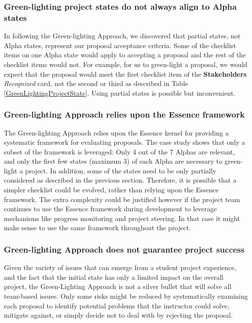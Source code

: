 \subsubsection{Green-lighting project states do not always
align to Alpha states}

In following the Green-lighting Approach, we discovered that partial
states, not Alpha states, represent our proposal acceptance criteria.
Some of the checklist items on one Alpha state would apply to accepting
a proposal and the rest of the checklist items would not. For example, 
for us to green-light a proposal, we would expect that the
proposal would meet the first checklist item of the
 \textbf{Stakeholders} \textit{Recognized} card, not the second or third as
described in Table \ref{GreenLightingProjectState}. 
Using partial states is possible but inconvenient. 

\subsubsection{Green-lighting Approach relies upon the Essence framework}
The Green-lighting Approach relies upon the Essence kernel for providing 
a systematic framework for evaluating proposals. The case study shows that  
only a subset of the framework is leveraged: Only 4 out of the 7 Alphas are 
relevant, and only the first few states (maximum 3) of each Alpha are necessary 
to green-light a project. In addition, some of the states need to be only partially 
considered as described in the previous section. Therefore, it is possible that a simpler checklist 
could be evolved, rather than relying upon the Essence framework. The extra 
complexity could be justified however if the project team continues to use 
the Essence framework during development to leverage mechanisms like progress 
monitoring and project steering. In that case it might make sense to use the 
same framework throughout the project.

\subsubsection{Green-lighting Approach does not guarantee project success}
Given the variety of issues that can emerge from a student project experience, and the fact that the initial state has only a limited impact on the overall project, the Green-Lighting Approach is not a silver bullet that will solve all team-based issues.
Only some risks might be reduced by systematically examining each proposal to identify
potential problems that the instructor could solve, mitigate against, 
or simply decide not to deal with by rejecting the proposal.

